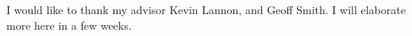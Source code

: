 \documentclass[final,numrefs,sort&compress,noinfo]{nddiss2e}
\begin{document}
\tableofcontents
\listoffigures
\listoftables



\begin{acknowledge}
I would like to thank my advisor Kevin Lannon, and Geoff Smith. I will elaborate more here in a few weeks. 
\end{acknowledge}

\mainmatter






%




\end{document}
